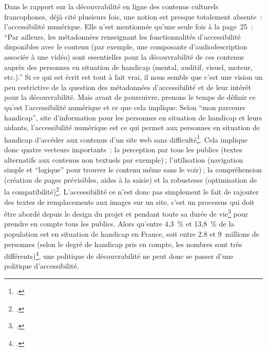 Dans le rapport sur la découvrabilité en ligne des contenus culturels francophones, déjà cité plusieurs fois, une notion est presque totalement absente : l’accessibilité numérique. Elle n’est mentionnée qu’une seule fois à la page 25 : \enquote{Par ailleurs, les métadonnées renseignant les fonctionnalités d’accessibilité disponibles avec le contenu (par exemple, une composante d’audiodescription associée à une vidéo) sont essentielles pour la découvrabilité de ces contenus auprès des personnes en situation de handicap (mental, auditif, visuel, moteur, etc.).} Si ce qui est écrit est tout à fait vrai, il nous semble que c’est une vision un peu restrictive de la question des métadonnées d’accessibilité et de leur intérêt pour la découvrabilité. Mais avant de poursuivre, prenons le temps de définir ce qu’est l’accessibilité numérique et ce que cela implique. Selon \enquote{mon parcours handicap}, site d’information pour les personnes en situation de handicap et leurs aidants, l’accessibilité numérique est ce qui permet aux personnes en situation de handicap d’accéder aux contenus d’un site web sans difficulté\footcite{noauthor_accessibilite_nodate}. Cela implique donc quatre vecteurs importants : la perception par tous les publics (textes alternatifs aux contenus non textuels par exemple) ; l’utilisation (navigation simple et \enquote{logique} pour trouver le contenu même sans le voir) ; la compréhension (création de pages prévisibles, aides à la saisie) et la robustesse (optimisation de la compatibilité)\footcite{noauthor_notion_nodate}. L’accessibilité ce n’est donc pas simplement le fait de rajouter des textes de remplacements aux images sur un site, c’est un processus qui doit être abordé depuis le design du projet et pendant toute sa durée de vie\footcite{noauthor_accessibilite_nodate} pour prendre en compte tous les publics. Alors qu’entre 4,3 \% et 13,8 \% de la population est en situation de handicap en France, soit entre 2.8 et 9 millions de personnes (selon le degré de handicap pris en compte, les nombres sont très différents)\footcite{noauthor_personnes_2022}, une politique de découvrabilité ne peut donc se passer d’une politique d’accessibilité.


